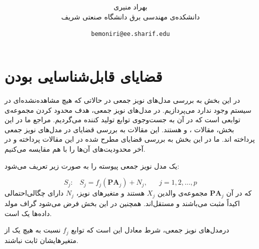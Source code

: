 \documentclass{article}
\title{
\textbf{\lr{Additive Noise Models: Identifiability, Learning Algorithms, Hidden Variables and Cycles}}
}
\author{بهراد منیری\\دانشکده‌ی مهندسی برق  دانشگاه صنعتی شریف}
\date{\texttt{bemoniri@ee.sharif.edu}}
\begin{document}
\maketitle
\tableofcontents
\section{قضایای قابل‌شناسایی بودن}
در این بخش به بررسی مدل‌های نویز جمعی در حالاتی که هیچ 
مشاهده‌نشده‌ای در سیستم وجود ندارد می‌پردازیم. در مدل‌های نویز جمعی، هدف محدود کردن مجموعه‌ی توابعی است که در آن به جست‌و‌جوی توابع تولید کننده  
می‌گردیم.
مراجع ما در این بخش، مقالات 
\cite{hoyer}،
\cite{continous}
و
\cite{postnonlinear}
هستند. این مقالات به بررسی قضایای 
در مدل‌های نویز جمعی پرداخته اند. ما در این بخش به بررسی قضایای مطرح شده در این مقالات پرداخته و در آخر محدودیت‌های  آن‌ها را با هم مقایسه ‌می‌کنیم.
\begin{den}
 یک مدل نویز جمعی پیوسته را به صورت زیر تعریف می‌شود:

\begin{equation}
S_j:\;\;\;S_j=f_j(\textbf{PA}_j) + N_j, \;\;\;\;\;\; j = 1,2,...,p
\end{equation}
که در آن 
$\textbf{PA}_j$
مجموعه‌ی والدین $X_j$ هستند و متغیرهای نویز، $N_j$ دارای چگالی‌احتمالی اکیداً مثبت می‌باشند و مستقل‌اند. همچنین در این بخش فرض می‌شود گراف مولد داده‌ها یک 
است. 

\end{den}
\begin{thm}
درمدل‌های نویز جمعی، شرط  
معادل این است که توابع $f_j$ نسبت به هیچ یک از متغیرهایشان ثابت نباشند.
\end{thm}
\end{document}
